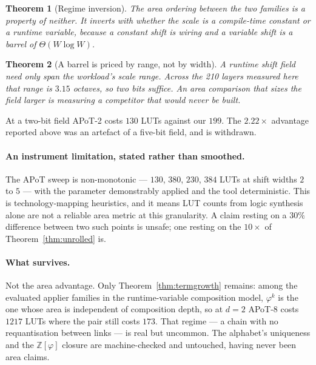 \documentclass[11pt]{article}
\newtheorem{theorem}{Theorem}
\theoremstyle{definition}
\begin{document}
\begin{theorem}[Regime inversion]
\label{thm:regime}
The area ordering between the two families is a property of neither. It inverts
with whether the scale is a compile-time constant or a runtime variable, because
a constant shift is wiring and a variable shift is a barrel of
$\Theta(W\log W)$.
\end{theorem}

\begin{theorem}[A barrel is priced by range, not by width]
\label{thm:barrelrange}
A runtime shift field need only span the workload's scale range. Across the 210
layers measured here that range is $3.15$ octaves, so two bits suffice. An area
comparison that sizes the field larger is measuring a competitor that would never
be built.
\end{theorem}

At a two-bit field APoT-2 costs $130$ LUTs against our $199$. The $2.22\times$
advantage reported above was an artefact of a five-bit field, and is withdrawn.

\paragraph{An instrument limitation, stated rather than smoothed.} The APoT sweep
is non-monotonic --- $130$, $380$, $230$, $384$ LUTs at shift widths $2$ to $5$
--- with the parameter demonstrably applied and the tool deterministic. This is
technology-mapping heuristics, and it means LUT counts from logic synthesis alone
are not a reliable area metric at this granularity. A claim resting on a $30\%$
difference between two such points is unsafe; one resting on the $10\times$ of
Theorem~\ref{thm:unrolled} is.

\paragraph{What survives.} Not the area advantage. Only
Theorem~\ref{thm:termgrowth} remains: among the evaluated applier families in the
runtime-variable composition model, $\varphi^{k}$ is the one whose
area is independent of composition depth, so at $d=2$ APoT-8 costs $1217$ LUTs
where the pair still costs $173$. That regime --- a chain with no requantisation
between links --- is real but uncommon. The alphabet's uniqueness and the
$\mathbb{Z}[\varphi]$ closure are machine-checked and untouched, having never
been area claims.
\end{document}
